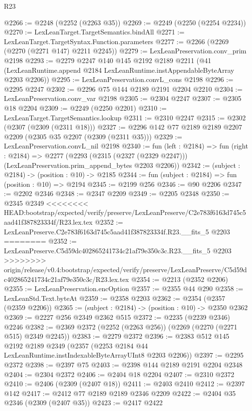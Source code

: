 \begin{lexlean}{R23}
\begin{coremodule}
{{{{{{{{{{{{{{{{{{{{{@2266 := @2248 (@2252 (@2263 @35))
@2269 := @2249 (@2250 (@2254 @2234))
@2270 := LexLeanTarget.TargetSemantics.bindAll
@2271 := LexLeanTarget.TargetSyntax.Function.parameters
@2277 := @2266 (@2269 (@2270 (@2271 @147) @2211 @2245))
@2279 := LexLeanPreservation.conv_prim @2198
@2293 := @2279
    @2247
    @140
    @145
    @2192
    @2189
    @2211
    (@41 (LexLeanRuntime.append @2184 LexLeanRuntime.instAppendableByteArray @2203 @2206))
@2295 := LexLeanPreservation.convL_cons @2198
@2296 := @2295 @2247
@2302 := @2296 @75 @144 @2189 @2191 @2204 @2210
@2304 := LexLeanPreservation.conv_var @2198
@2305 := @2304 @2247
@2307 := @2305 @18 @2204
@2309 := @2249 (@2250 @2201)
@2310 := LexLeanTarget.TargetSemantics.lookup
@2311 := @2310 @2247
@2315 := @2302 (@2307 (@2309 (@2311 @18)))
@2327 := @2296 @142 @77 @2189 @2189 @2207 @2209 (@2305 @35 @2207 (@2309 (@2311 @35)))
@2329 := LexLeanPreservation.convL_nil @2198
@2340 := fun (left : @2184) =>
  fun (right : @2184) =>
  @2277 (@2293 (@2315 (@2327 (@2329 @2247))) (LexLeanPreservation.prim_append_bytes @2203 @2206))
@2342 := (subject : @2184) -> (position : @10) -> @2185
@2344 := fun (subject : @2184) => fun (position : @10) => @2194
@2345 := @2199 @256
@2346 := @90 @2206
@2347 := @2202 @2346
@2348 := @2347 @2209
@2349 := @2205 @2348
@2350 := @2345 @2349
<<<<<<<< HEAD:bootstrap/expected/verify/preserve/LexLeanPreserve/C2e783f6163d745c5aad41f387823334f/R23.lex.tex
@2352 := LexLeanPreserve.C2e783f6163d745c5aad41f387823334f.R23.__fits_5 @2203
========
@2352 := LexLeanPreserve.C5d59dc402865241734c21af79e350c3c.R23.__fits_5 @2203
>>>>>>>> origin/release/v0.4:bootstrap/expected/verify/preserve/LexLeanPreserve/C5d59dc402865241734c21af79e350c3c/R23.lex.tex
@2354 := @2213 (@2352 @2206)
@2355 := LexLeanPreservation.encOption
@2357 := @2355 @44 @290
@2358 := LexLeanStd.Text.byteAt
@2359 := @2358 @2203
@2362 := @2354 (@2357 (@2359 @2206))
@2365 := (subject : @2184) -> (position : @10) -> @2350 @2362
@2369 := @2227 @256 @2349 @2362 @515
@2372 := @2235 (@2239 @2346) @2246
@2382 := @2369 @2372 (@2252 (@2263 @256)) (@2269 (@2270 (@2271 @515) @2349 @2245))
@2383 := @2279 @2372
@2396 := @2383
    @512
    @145
    @2192
    @2189
    @2349
    (@2357 (@2253 @2184 @44 LexLeanRuntime.instIndexableByteArrayUInt8 @2203 @2206))
@2397 := @2295 @2372
@2398 := @2397 @75
@2403 := @2398 @144 @2189 @2191 @2204 @2348
@2404 := @2304 @2372
@2406 := @2404 @18 @2204
@2407 := @2310 @2372
@2410 := @2406 (@2309 (@2407 @18))
@2411 := @2403 @2410
@2412 := @2397 @142
@2417 := @2412 @77 @2189 @2189 @2346 @2209
@2422 := @2404 @35 @2346 (@2309 (@2407 @35))
@2423 := @2417 @2422
}}}}}}}}}}}}}}}}}}}}}
\end{coremodule}
\end{lexlean}
